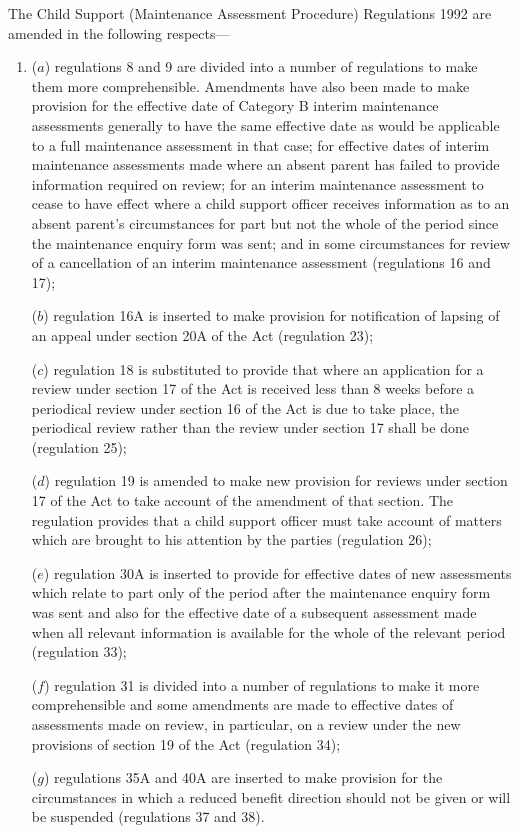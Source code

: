 \documentclass[12pt,a4paper]{article}
\begin{document}
 The Child Support (Maintenance Assessment Procedure) Regulations 1992 are amended in the following respects—
\begin{enumerate}\item[]
 ($a$) regulations 8 and 9 are divided into a number of regulations to make them more comprehensible. Amendments have also been made to make provision for the effective date of Category B interim maintenance assessments generally to have the same effective date as would be applicable to a full maintenance assessment in that case; for effective dates of interim maintenance assessments made where an absent parent has failed to provide information required on review; for an interim maintenance assessment to cease to have effect where a child support officer receives information as to an absent parent’s circumstances for part but not the whole of the period since the maintenance enquiry form was sent; and in some circumstances for review of a cancellation of an interim maintenance assessment (regulations 16 and 17);

 ($b$) regulation 16A is inserted to make provision for notification of lapsing of an appeal under section 20A of the Act (regulation 23);

 ($c$) regulation 18 is substituted to provide that where an application for a review under section 17 of the Act is received less than 8 weeks before a periodical review under section 16 of the Act is due to take place, the periodical review rather than the review under section 17 shall be done (regulation 25);

 ($d$) regulation 19 is amended to make new provision for reviews under section 17 of the Act to take account of the amendment of that section. The regulation provides that a child support officer must take account of matters which are brought to his attention by the parties (regulation 26);

 ($e$) regulation 30A is inserted to provide for effective dates of new assessments which relate to part only of the period after the maintenance enquiry form was sent and also for the effective date of a subsequent assessment made when all relevant information is available for the whole of the relevant period (regulation 33);

 ($f$) regulation 31 is divided into a number of regulations to make it more comprehensible and some amendments are made to effective dates of assessments made on review, in particular, on a review under the new provisions of section 19 of the Act (regulation 34);

 ($g$) regulations 35A and 40A are inserted to make provision for the circumstances in which a reduced benefit direction should not be given or will be suspended (regulations 37 and 38).
\end{enumerate}
\end{document}
